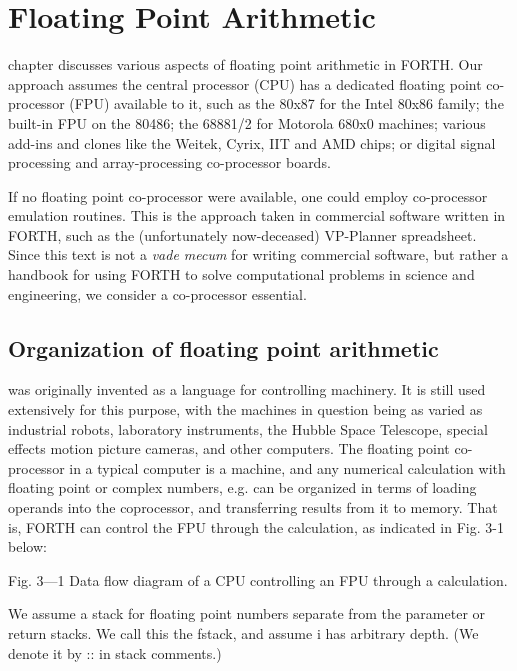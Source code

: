 
\chapter{Floating Point Arithmetic}

\tableofcontents

 chapter discusses various aspects of floating point arithmetic in
FORTH. Our approach assumes the central processor (CPU) has a dedicated floating
point co-processor (FPU)
available to it, such as the 80x87 for the Intel 80x86 family; the
built-in FPU on the 80486; the 68881/2 for Motorola 680x0
machines; various add-ins and clones like the Weitek, Cyrix, IIT
and AMD chips; or digital signal processing and array-processing
co-processor boards.

If no floating point co-processor were available, one could
employ co-processor emulation routines. This is the approach
taken in commercial software written in FORTH, such as the
(unfortunately now-deceased) VP-Planner spreadsheet. Since
this text is not a \textit{vade mecum} for writing commercial software, but
rather a handbook for using FORTH to solve computational
problems in science and engineering, we consider a co-processor
essential.

\section{Organization of floating point arithmetic}

 was originally invented as a language for controlling 
machinery. It is still used extensively for this purpose, with the
machines in question being as varied as industrial robots,
laboratory instruments, the Hubble Space Telescope, special
effects motion picture cameras, and other computers. The floating point
co-processor in a typical computer is a machine, and any
numerical calculation with floating point or complex numbers,
e.g. can be organized in terms of loading operands into the
coprocessor, and transferring results from it to memory. That is,
FORTH can control the FPU through the calculation, as indicated in Fig. 3-1
below:

 

Fig. 3—1 Data flow diagram of a CPU controlling an FPU through a
calculation.

We assume a stack for floating point numbers separate from the 
parameter or return stacks. We call this the fstack, and assume i
has arbitrary depth. (We denote it by :: in stack comments.)


